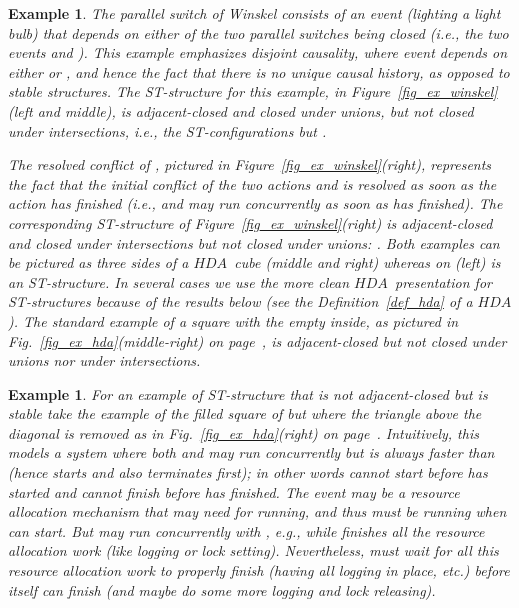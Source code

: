 \documentclass[submission,copyright,creativecommons]{eptcs}
\newtheorem{example}[theorem]{Example}
\newcounter{case}
\newcommand\HDA{\ensuremath{\mathit{HDA}}}
\begin{document}
\begin{example}\label{ex_Winskel_switch_resolved_conflict}
The parallel switch of Winskel \cite[Ex.1.1.7]{Winskel86} consists of an event  (lighting a light bulb) that depends on either of the two parallel switches being closed (i.e., the two events  and ). This example emphasizes \textit{disjoint causality}, where event  depends on either  or , and hence the fact that there is no \textit{unique causal history}, as opposed to \textit{stable structures}.
The ST-structure for this example, in Figure~\ref{fig_ex_winskel}(left and middle), is adjacent-closed and closed under unions, but not closed under intersections, i.e., the ST-configurations  but . 

The resolved conflict of \cite[Ex.2]{GlabbeekP09configStruct}, pictured in Figure~\ref{fig_ex_winskel}(right), represents the fact that the initial conflict of the two actions  and  is resolved as soon as the action  has finished (i.e.,  and  may run concurrently as soon as  has finished). The corresponding ST-structure of Figure~\ref{fig_ex_winskel}(right) is adjacent-closed and closed under intersections but not closed under unions:  .
Both examples can be pictured as three sides of a \HDA\ cube (middle and right) whereas on (left) is an ST-structure. In several cases we use the more clean \HDA\ presentation for ST-structures because of the results below (see the Definition~\ref{def_hda} of a \HDA).
The standard example of a square with the empty inside, as pictured in Fig.~\ref{fig_ex_hda}(middle-right) on page~\pageref{fig_ex_hda}, is adjacent-closed but not closed under unions nor under intersections.
\end{example}


\begin{example}\label{ex_not_adjacent_stable}
For an example of ST-structure that is not adjacent-closed but is stable take the example of the filled square of  but where the triangle above the diagonal is removed as in Fig.~\ref{fig_ex_hda}(right) on page~\pageref{fig_ex_hda}. Intuitively, this models a system where both  and  may run concurrently but  is always faster than  (hence starts and also terminates first); in other words  cannot start before  has started and cannot finish before  has finished. 
The event  may be a resource allocation mechanism that  may need for running, and thus  must be running when  can start. But  may run concurrently with , e.g., while  finishes all the resource allocation work (like logging or lock setting). Nevertheless,  must wait for all this resource allocation work to properly finish (having all logging in place, etc.) before itself can finish (and maybe do some more logging and lock releasing).
\end{example}
\end{document}

